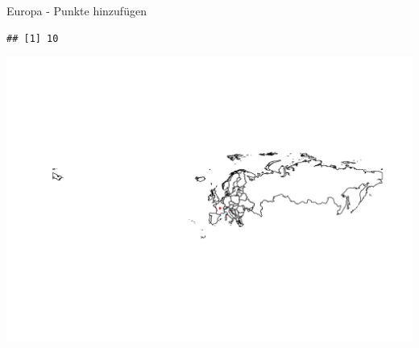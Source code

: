 \documentclass[ignorenonframetext,]{beamer}
\newenvironment{Shaded}{\begin{snugshade}}{\end{snugshade}}
\newcommand{\CommentTok}[1]{\textcolor[rgb]{0.00,0.40,1.00}{\textbf{\textit{#1}}}}
\newcommand{\DataTypeTok}[1]{\textcolor[rgb]{0.74,0.68,0.62}{\underline{#1}}}
\newcommand{\DecValTok}[1]{\textcolor[rgb]{0.27,0.67,0.26}{#1}}
\newcommand{\KeywordTok}[1]{\textcolor[rgb]{0.26,0.66,0.93}{\textbf{#1}}}
\newcommand{\NormalTok}[1]{\textcolor[rgb]{0.74,0.68,0.62}{#1}}
\newcommand{\OperatorTok}[1]{\textcolor[rgb]{0.74,0.68,0.62}{#1}}
\newcommand{\StringTok}[1]{\textcolor[rgb]{0.02,0.61,0.04}{#1}}
\begin{document}
\begin{frame}[fragile]{Europa - Punkte hinzufügen}
\protect\hypertarget{europa---punkte-hinzufugen}{}

\begin{Shaded}
\end{Shaded}

\begin{verbatim}
## [1] 10
\end{verbatim}

\begin{Shaded}
\end{Shaded}

\includegraphics{Geomedizin_files/figure-beamer/unnamed-chunk-84-1.pdf}

\end{frame}
\end{document}
